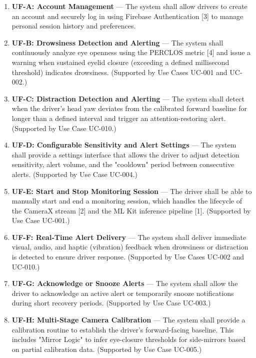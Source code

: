\documentclass[11pt]{report}
\begin{document}
\begin{enumerate}

    \item \textbf{UF-A: Account Management} —
    The system shall allow drivers to create an account and securely log in using Firebase Authentication [3] to manage personal session history and preferences.

    \item \textbf{UF-B: Drowsiness Detection and Alerting} —
    The system shall continuously analyze eye openness using the PERCLOS metric [4] and issue a warning when sustained eyelid closure (exceeding a defined millisecond threshold) indicates drowsiness. (Supported by Use Cases UC-001 and UC-002.)

    \item \textbf{UF-C: Distraction Detection and Alerting} —
    The system shall detect when the driver’s head yaw deviates from the calibrated forward baseline for longer than a defined interval and trigger an attention-restoring alert. (Supported by Use Case UC-010.)

    \item \textbf{UF-D: Configurable Sensitivity and Alert Settings} —
    The system shall provide a settings interface that allows the driver to adjust detection sensitivity, alert volume, and the "cooldown" period between consecutive alerts. (Supported by Use Case UC-004.)

    \item \textbf{UF-E: Start and Stop Monitoring Session} —
    The driver shall be able to manually start and end a monitoring session, which handles the lifecycle of the CameraX stream [2] and the ML Kit inference pipeline [1]. (Supported by Use Case UC-001.)

    \item \textbf{UF-F: Real-Time Alert Delivery} —
    The system shall deliver immediate visual, audio, and haptic (vibration) feedback when drowsiness or distraction is detected to ensure driver response. (Supported by Use Cases UC-002 and UC-010.)

    \item \textbf{UF-G: Acknowledge or Snooze Alerts} —
    The system shall allow the driver to acknowledge an active alert or temporarily snooze notifications during short recovery periods. (Supported by Use Case UC-003.)

    \item \textbf{UF-H: Multi-Stage Camera Calibration} —
    The system shall provide a calibration routine to establish the driver's forward-facing baseline. This includes "Mirror Logic" to infer eye-closure thresholds for side-mirrors based on partial calibration data. (Supported by Use Case UC-005.)


\end{enumerate}
\end{document}
